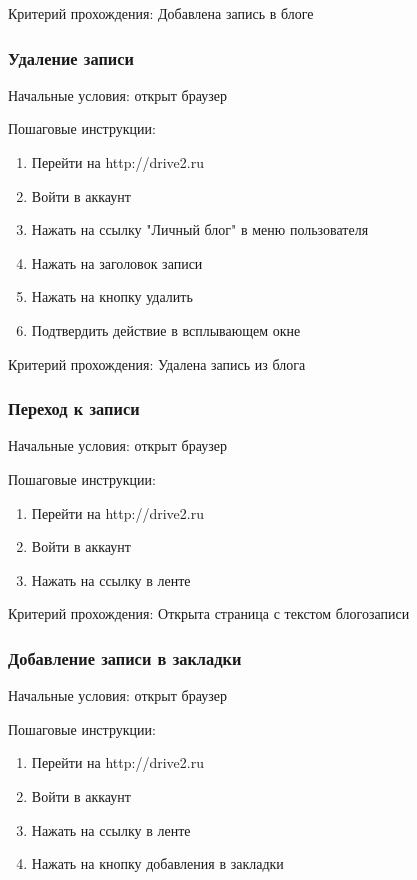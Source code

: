 Критерий прохождения: Добавлена запись в блоге

\subsubsection{Удаление записи}

Начальные условия: открыт браузер

Пошаговые инструкции:
\begin{enumerate}
\item Перейти на http://drive2.ru
\item Войти в аккаунт
\item Нажать на ссылку "Личный блог" в меню пользователя
\item Нажать на заголовок записи
\item Нажать на кнопку удалить
\item Подтвердить действие в всплывающем окне
\end{enumerate}

Критерий прохождения: Удалена запись из блога
\subsubsection{Переход к записи}

Начальные условия: открыт браузер

Пошаговые инструкции:
\begin{enumerate}
\item Перейти на http://drive2.ru
\item Войти в аккаунт
\item Нажать на ссылку в ленте
\end{enumerate}

Критерий прохождения: Открыта страница с текстом блогозаписи
\subsubsection{Добавление записи в закладки}

Начальные условия: открыт браузер

Пошаговые инструкции:
\begin{enumerate}
\item Перейти на http://drive2.ru
\item Войти в аккаунт
\item Нажать на ссылку в ленте
\item Нажать на кнопку добавления в закладки
\end{enumerate}

